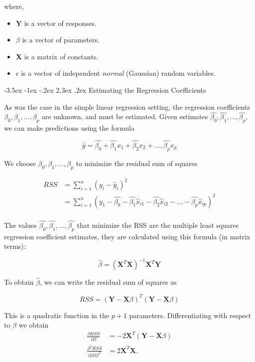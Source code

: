 \documentclass[]{book}
\makeatletter
\providecommand{\tightlist}{%
  \setlength{\itemsep}{0pt}\setlength{\parskip}{0pt}}
\renewcommand\section{\@startsection {section}{1}{\z@}%
                                   {-3.5ex \@plus -1ex \@minus -.2ex}%
                                   {2.3ex \@plus.2ex}%
                                   {\normalfont\Large\bfseries\color{ForestGreen}}}
\theoremstyle{definition}
\theoremstyle{definition}
\theoremstyle{definition}
\theoremstyle{remark}
\makeatother
\begin{document}
where,

\begin{itemize}
\tightlist
\item
  \(\textbf{Y}\) is a vector of responses.
\item
  \(\mathbb{\beta}\) is a vector of parameters.
\item
  \(\textbf{X}\) is a matrix of constants.
\item
  \(\epsilon\) is a vector of independent \emph{normal} (Gaussian)
  random variables.
\end{itemize}

\section{Estimating the Regression
Coefficients}\label{estimating-the-regression-coefficients}

As was the case in the simple linear regression setting, the regression
coefficients \(\beta_{0}, \beta_{1}, \ldots, \beta_{p}\) are unknown,
and must be estimated. Given estimates
\(\hat{\beta_{0}}, \hat{\beta_{1}}, \ldots, \hat{\beta_{p}}\), we can
make predictions using the formula

\[ \hat{y} = \hat{\beta_{0}} + \hat{\beta_{1}} x_1 + \hat{\beta_{2}} x_2 + \ldots, \hat{\beta_{p}} x_p \]

We choose \(\beta_{0}, \beta_{1}, \ldots, \beta_{p}\) to minimize the
residual sum of squares

\[ \begin{aligned}
RSS &= \sum_{i=1}^{n} (y_i - \hat{y}_i)^2 \\
    &= \sum_{i=1}^{n} (y_1 - \hat{\beta_0} - \hat{\beta_1} \hat{x}_{i1}  - \hat{\beta_2} \hat{x}_{i2} - \ldots  -  \hat{\beta_p} \hat{x}_{ip})^2 \\
\end{aligned}
\]

The values \(\hat{\beta_{0}}, \hat{\beta_{1}}, \ldots, \hat{\beta_{p}}\)
that minimize the RSS are the multiple least squares regression
coefficient estimates, they are calculated using this formula (in matrix
terms):

\[ \hat{\beta} = (\textbf{X}^T \textbf{X})^{-1}\textbf{X}^T \textbf{Y} \]

To obtain \(\hat{\beta}\), we can write the residual sum of squares as

\[ RSS = (\textbf{Y}-\textbf{X}\beta)^T(\textbf{Y}-\textbf{X}\beta) \]

This is a quadratic function in the \(p+1\) parameters. Differentiating
with respect to \(\beta\) we obtain \[ \begin{aligned}
\frac{\partial RSS}{\partial \beta} &= -2\textbf{X}^T(\textbf{Y}-\textbf{X}\beta) \\
\frac{\partial^2 RSS}{\partial \beta \partial \beta^T}   &= 2\textbf{X}^T\textbf{X}.\\
\end{aligned}
\]
\end{document}
